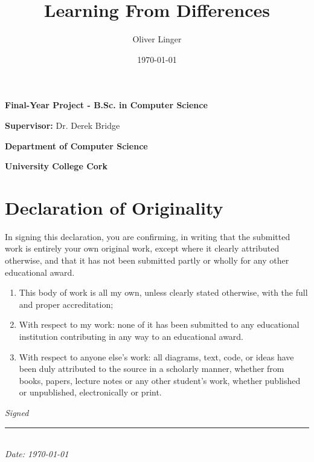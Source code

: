 \documentclass[a4paper, 12pt]{report}
\title{Learning From Differences}
\author{Oliver Linger}
\date{\today}
\begin{document}
\maketitle

\vspace*{\fill} %

\centering
\textbf{Final-Year Project - B.Sc. in Computer Science}

\textbf{Supervisor:} Dr. Derek Bridge

\textbf{Department of Computer Science}

\textbf{University College Cork}

\vspace*{\fill} %

\begin{abstract}
\end{abstract}


\section*{Declaration of Originality}
In signing this declaration, you are confirming, in writing that the submitted
work is entirely your own original work, except where it clearly attributed otherwise,
and that it has not been submitted partly or wholly for any other educational award.
\begin{enumerate}
	\item This body of work is all my own, unless clearly stated otherwise, with the full and proper accreditation;
	\item With respect to my work: none of it has been submitted to any educational institution contributing in any way to an educational award.
	\item With respect to anyone else's work: all diagrams, text, code, or ideas have been duly attributed to the source in a scholarly manner,
	      whether from books, papers, lecture notes or any other student's work, whether published or unpublished, electronically or print.
\end{enumerate}

\vspace{2em} %

\begin{flushright}
	\textit{Signed} \\
	\rule{6cm}{0.4pt} \\
	\textit{Date: \today}
\end{flushright}
\end{document}
